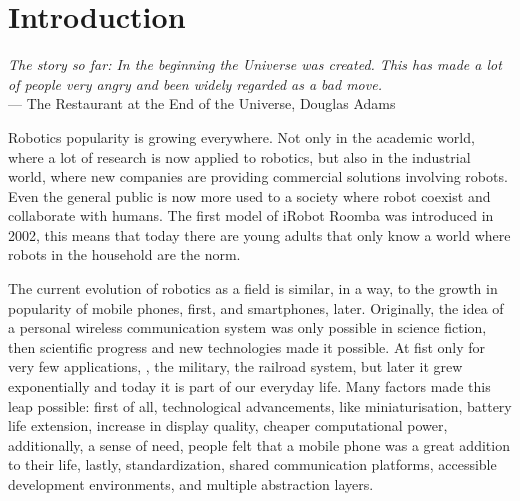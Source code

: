 \chapter{Introduction}\label{ch:introduction}

\begin{flushright}{\slshape The story so far: In the beginning the Universe was created. This has made a lot of people very angry and been widely regarded as a bad move.} \\ \medskip
    ---  The Restaurant at the End of the Universe, Douglas Adams 
\end{flushright}

Robotics popularity is growing everywhere. Not only in the academic world, where a lot of research is now applied to robotics, but also in the industrial world, where new companies are providing commercial solutions involving robots. Even the general public is now more used to a society where robot coexist and collaborate with humans. The first model of iRobot Roomba was introduced in 2002, this means that today there are young adults that only know a world where robots in the household are the norm.

The current evolution of robotics as a field is similar, in a way, to the growth in popularity of mobile phones, first, and smartphones, later.  Originally, the idea of a personal wireless communication system was only possible in science fiction, then scientific progress and new technologies made it possible. At fist only for very few applications, \ie, the military, the railroad system, but later it grew exponentially and today it is part of our everyday life. Many factors made this leap possible: first of all, technological advancements, like miniaturisation, battery life extension, increase in display quality, cheaper computational power, additionally, a sense of need, people felt that a mobile phone was a great addition to their life, lastly, standardization, shared communication platforms, accessible development environments, and multiple abstraction layers.

